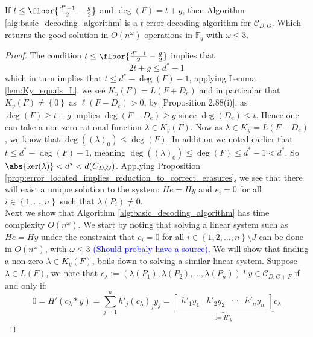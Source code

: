 \begin{theorem}\label{thm:basic_decoding_algorithm_works}
If $t \leq \floor{\frac{d^{*} - 1}{2} - \frac{g}{2}}$ and $\deg(F) = t + g$, then Algorithm \ref{alg:basic_decoding_algorithm} is a $t$-error decoding algorithm for $\mathcal{C}_{D, G}$. Which returns the good solution in $O(n^{\omega})$ operations in $\mathbb{F}_q$ with $\omega \leq 3$.
\end{theorem}
\begin{proof}
  The condition $t \leq \floor{\frac{d^{*} - 1}{2} - \frac{g}{2}}$ implies that
  \begin{equation*}
    2t + g \leq d^{*} - 1
  \end{equation*}
  which in turn implies that $t \leq d^{*} - \deg(F) - 1$, applying Lemma \ref{lem:Ky_equals_L}, we see $K_y(F) = L(F + D_e)$ and in particular that $K_y(F) \neq \left\{0\right\}$ as $\ell(F - D_e) > 0$, by \cite{bachellor}[Proposition 2.88(i)], as $\deg(F) \geq t + g$ implies $\deg(F - D_e) \geq g$ since $\deg(D_e) \leq t$. Hence one can take a non-zero rational function $\lambda \in K_y(F)$. Now as $\lambda \in K_{y} = L(F - D_e)$, we know that $\deg( (\lambda)_{0} ) \leq \deg(F)$. In addition we noted earlier that $t \leq d^{*} - \deg(F) - 1$, meaning $\deg((\lambda)_{0}) \leq \deg(F) \leq d^{*} - 1 < d^{*}$. So $\abs{\ker(\lambda)} < d^{*} < d(C_{D, G})$. Applying Proposition \ref{prop:error_located_implies_reduction_to_correct_erasures}, we see that there will exist a unique solution to the system: $He = Hy$ and $e_{i} = 0$ for all $i \in \left\{1, \ldots, n\right\}$ such that $\lambda(P_i) \neq 0$. \\
  Next we show that Algorithm \ref{alg:basic_decoding_algorithm} has time complexity $O(n^{\omega})$. We start by noting that solving a linear system such as $He = Hy$ under the constraint that $e_i = 0$ for all $i \in \left\{1, 2, \ldots, n\right\} \setminus J$ can be done in $O(n^{\omega})$, with $\omega \leq 3$ \textcolor{blue}{(Should probaly have a source)}. We will show that finding a non-zero $\lambda \in K_y(F)$, boils down to solving a similar linear system. Suppose $\lambda \in L(F)$, we note that $c_\lambda := (\lambda(P_1), \lambda(P_2), \ldots, \lambda(P_n)) * y \in \mathcal{C}_{D, G + F}$ if and only if:
  \begin{equation*}
    0 = H'(c_\lambda * y) = \sum_{j = 1}^n h'_j (c_\lambda)_{j} y_{j} = \underset{:= H'_y}{\underbrace{\begin{bmatrix}
h'_1 y_1 & h'_2 y_2 & \cdots & h'_n y_{n}
                                                          \end{bmatrix}}} c_{\lambda}

\end{equation*}
\end{proof}
